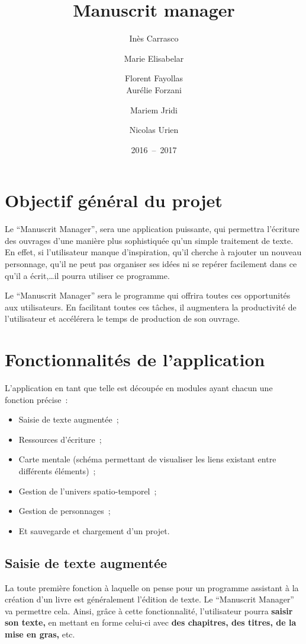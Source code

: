 \documentclass[a4paper,11pt,twoside]{article}
\title{Manuscrit manager}
\author{Inès Carrasco \and Marie Elisabelar \and Florent Fayollas\\
		Aurélie Forzani \and Mariem Jridi \and Nicolas Urien}
\date{2016~--~2017}
\begin{document}
\maketitle
\newpage

\section{Objectif général du projet}
Le ``Manuscrit Manager'', sera une application puissante, qui permettra l'écriture des ouvrages d'une manière plus sophistiquée qu'un simple traitement de texte. En effet, si l'utilisateur manque d'inspiration, qu'il cherche à rajouter un nouveau personnage, qu'il ne peut pas organiser ses idées ni se repérer facilement dans ce qu'il a écrit,\ldots il pourra utiliser ce programme.

Le ``Manuscrit Manager'' sera le programme qui offrira toutes ces opportunités aux utilisateurs. En facilitant toutes ces tâches, il augmentera la productivité de l'utilisateur et accélérera le temps de production de son ouvrage.


\section{Fonctionnalités de l'application}
L'application en tant que telle est découpée en modules ayant chacun une fonction précise~:
\begin{itemize}
	\item Saisie de texte augmentée~;
    \item Ressources d'écriture~;
    \item Carte mentale (schéma permettant de visualiser les liens existant entre différents éléments)~;
    \item Gestion de l'univers spatio-temporel~;
    \item Gestion de personnages~;
    \item Et sauvegarde et chargement d'un projet.
\end{itemize}


\subsection{Saisie de texte augmentée}
La toute première fonction à laquelle on pense pour un programme assistant à la création d'un livre est généralement l'édition de texte. Le ``Manuscrit Manager'' va permettre cela. Ainsi, grâce à cette fonctionnalité, l'utilisateur pourra \textbf{saisir son texte,} en mettant en forme celui-ci avec \textbf{des chapitres, des titres, de la mise en gras,} etc.
\end{document}
